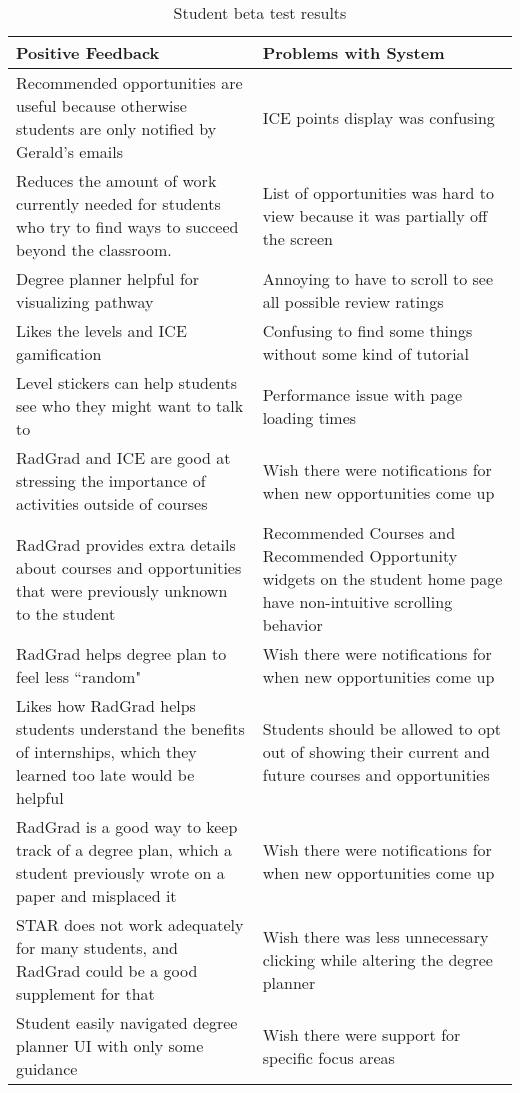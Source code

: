 \begin{table}[htbp!]
\centering
\caption{Student beta test results}
\begin{tabular}{ |p{8cm}|p{8cm}|}
 \hline
\textbf{Positive Feedback} & \textbf{Problems with System} \\
 \hline
 Recommended opportunities are useful because otherwise students are only notified by Gerald's emails  & ICE points display was confusing \\
 \hline
 Reduces the amount of work currently needed for students who try to find ways to succeed beyond the classroom. &List of opportunities was hard to view because it was partially off the screen\\
 \hline
 Degree planner helpful for visualizing pathway &Annoying to have to scroll to see all possible review ratings\\
  \hline
Likes the levels and ICE gamification &Confusing to find some things without some kind of tutorial \\
 \hline
Level stickers can help students see who they might want to talk to &Performance issue with page loading times \\
 \hline
RadGrad and ICE are good at stressing the importance of activities outside of courses &Wish there were notifications for when new opportunities come up\\
 \hline
RadGrad provides extra details about courses and opportunities that were previously unknown to the student &Recommended Courses and Recommended Opportunity widgets on the student home page have non-intuitive scrolling behavior\\
 \hline
RadGrad helps degree plan to feel less ``random" &Wish there were notifications for when new opportunities come up\\
 \hline
Likes how RadGrad helps students understand the benefits of internships, which they learned too late would be helpful &Students should be allowed to opt out of showing their current and future courses and opportunities\\
 \hline
RadGrad is a good way to keep track of a degree plan, which a student previously wrote on a paper and misplaced it & Wish there were notifications for when new opportunities come up \\
 \hline
 STAR does not work adequately for many students, and RadGrad could be a good supplement for that & Wish there was less unnecessary clicking while altering the degree planner\\
 \hline
Student easily navigated degree planner UI with only some guidance &Wish there were support for specific focus areas\\

\end{tabular}
\end{table}
